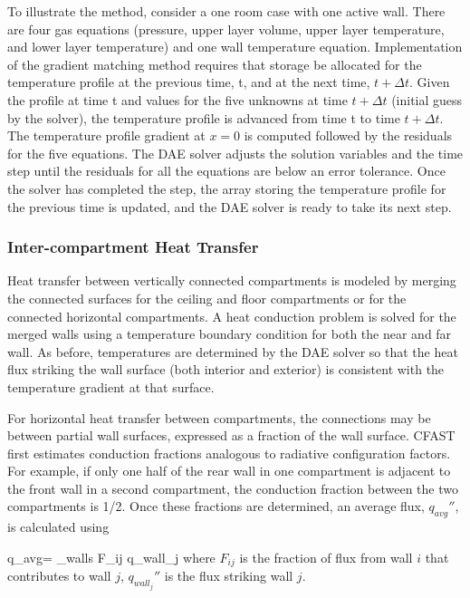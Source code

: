 To illustrate the method, consider a one room case with one active wall.  There are four gas equations (pressure, upper layer volume, upper layer temperature, and lower layer temperature) and one wall temperature equation.  Implementation of the gradient matching method requires that storage be allocated for the temperature profile at the previous time, t, and at the next time, $t + \Delta t$.  Given the profile at time t and values for the five unknowns at time $t + \Delta t$ (initial guess by the solver), the temperature profile is advanced from time t to time $t + \Delta t$.  The temperature profile gradient at $x = 0$ is computed followed by the residuals for the five equations.  The DAE solver adjusts the solution variables and the time step until the residuals for all the equations are below an error tolerance.  Once the solver has completed the step, the array storing the temperature profile for the previous time is updated, and the DAE solver is ready to take its next step.

\subsubsection{Inter-compartment Heat Transfer}

Heat transfer between vertically connected compartments is modeled by merging the connected surfaces for the ceiling and floor compartments or for the connected horizontal compartments.  A heat conduction problem is solved for the merged walls using a temperature boundary condition for both the near and far wall.  As before, temperatures are determined by the DAE solver so that the heat flux striking the wall surface (both interior and exterior) is consistent with the temperature gradient at that surface.

For horizontal heat transfer between compartments, the connections may be between partial wall surfaces, expressed as a fraction of the wall surface. CFAST first estimates conduction fractions analogous to radiative configuration factors.    For example, if only one half of the rear wall in one compartment is adjacent to the front wall in a second compartment, the conduction fraction between the two compartments is 1/2.   Once these fractions are determined, an average flux, $q_{avg}\dprime$, is calculated using

\be q_{avg}\dprime = \sum_{walls} F_{ij} q_{wall_j}\dprime \ee
where $F_{ij}$ is the fraction of flux from wall $i$ that contributes to wall $j$, $q_{wall_j}\dprime$ is the flux striking wall $j$.

